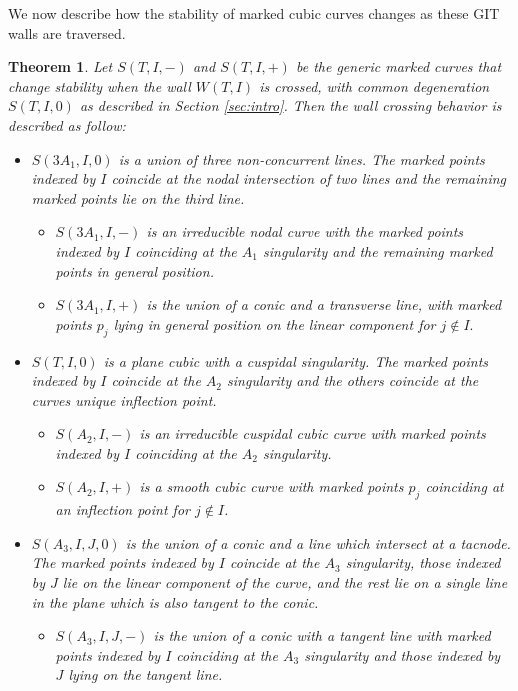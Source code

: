 \documentclass{amsart}
\numberwithin{equation}{section}
\newtheorem{thm}[prop]{Theorem}
\theoremstyle{definition}
\begin{document}
We now describe how the stability of marked cubic curves changes as these GIT walls are traversed.

\begin{thm}\label{thm:wallcrossing}
Let $S(T, I, -)$ and $S(T, I, +)$ be the generic marked curves that change stability when the wall $W(T,I)$ is crossed, with common degeneration $S(T,I,0)$ as described in Section \ref{sec:intro}. Then the wall crossing behavior is described as follow: 


\begin{itemize}
\item[(Case i)] $S(3A_1,I,0)$ is a union of three non-concurrent lines. The marked points indexed by $I$ coincide at the nodal intersection of two lines and the remaining marked points lie on the third line.
\begin{itemize}
    \item[$\bullet$] $S(3A_1,I,-)$ is an irreducible nodal curve with the marked points indexed by $I$ coinciding at the  $A_1$ singularity and the remaining marked points in general position.
    \item[$\bullet$] $S(3A_1,I,+)$ is the union of a conic and a transverse line, with marked points $p_j$ lying in general position on the linear component for $j \notin I.$
\end{itemize}
\item[(Case ii)] $S(T,I,0)$ is a plane cubic with a cuspidal singularity. The marked points indexed by $I$ coincide at the $A_2$ singularity and the others coincide at the curves unique inflection point.
\begin{itemize}
    \item[$\bullet$] $S(A_2,I, -)$ is an irreducible cuspidal cubic curve with marked points indexed by $I$ coinciding at the $A_2$ singularity.
    \item[$\bullet$] $S(A_2,I,+)$ is a smooth cubic curve with marked points $p_j$ coinciding at an inflection point for $j \notin I$. 
\end{itemize}
\item[(Case iii)] $S(A_3,I,J,0)$ is the union of a conic and a line which intersect at a tacnode. The marked points indexed by $I$ coincide at the $A_3$ singularity, those indexed by $J$ lie on the linear component of the curve, and the rest lie on a single line in the plane which is also tangent to the conic.
    \begin{itemize}
      \item[$\bullet$] $S(A_3, I, J,-)$ is the union of a conic with a tangent line with marked points indexed by $I$ coinciding at the $A_3$ singularity and those indexed by $J$ lying on the tangent line.

\end{itemize}
\end{itemize}
\end{thm}
\end{document}
